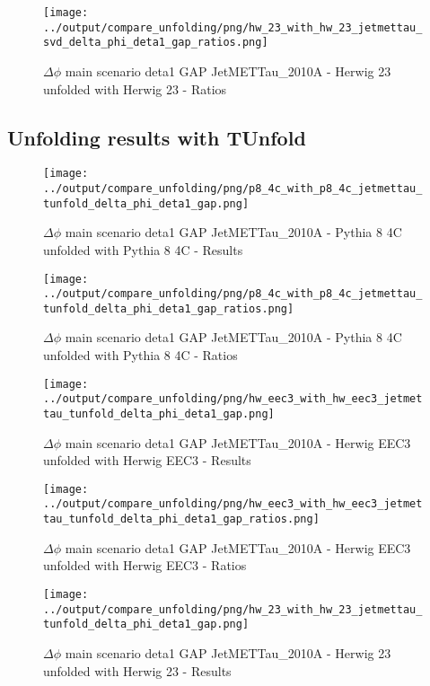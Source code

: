 \documentclass[11pt]{book}
\begin{document}
\begin{figure}[ht]
\centering
\texttt{[image: ../output/compare\_unfolding/png/hw\_23\_with\_hw\_23\_jetmettau\_svd\_delta\_phi\_deta1\_gap\_ratios.png]}
\caption{$\Delta\phi$ main scenario deta1 GAP JetMETTau\_2010A - Herwig 23 unfolded with Herwig 23 - Ratios}
\label{hw_23_hw_23_jetmettau_svd_delta_phi_deta1_gap_b}
\end{figure}


\clearpage
\subsection{Unfolding results with TUnfold}

\begin{figure}[ht]
\centering
\texttt{[image: ../output/compare\_unfolding/png/p8\_4c\_with\_p8\_4c\_jetmettau\_tunfold\_delta\_phi\_deta1\_gap.png]}
\caption{$\Delta\phi$ main scenario deta1 GAP JetMETTau\_2010A - Pythia 8 4C unfolded with Pythia 8 4C - Results}
\label{p8_p8_jetmettau_tunfold_delta_phi_deta1_gap_a}
\end{figure}

\begin{figure}[ht]
\centering
\texttt{[image: ../output/compare\_unfolding/png/p8\_4c\_with\_p8\_4c\_jetmettau\_tunfold\_delta\_phi\_deta1\_gap\_ratios.png]}
\caption{$\Delta\phi$ main scenario deta1 GAP JetMETTau\_2010A - Pythia 8 4C unfolded with Pythia 8 4C - Ratios}
\label{p8_p8_jetmettau_tunfold_delta_phi_deta1_gap_b}
\end{figure}

\begin{figure}[ht]
\centering
\texttt{[image: ../output/compare\_unfolding/png/hw\_eec3\_with\_hw\_eec3\_jetmettau\_tunfold\_delta\_phi\_deta1\_gap.png]}
\caption{$\Delta\phi$ main scenario deta1 GAP JetMETTau\_2010A - Herwig EEC3 unfolded with Herwig EEC3 - Results}
\label{hw_eec3_hw_eec3_jetmettau_tunfold_delta_phi_deta1_gap_a}
\end{figure}

\begin{figure}[ht]
\centering
\texttt{[image: ../output/compare\_unfolding/png/hw\_eec3\_with\_hw\_eec3\_jetmettau\_tunfold\_delta\_phi\_deta1\_gap\_ratios.png]}
\caption{$\Delta\phi$ main scenario deta1 GAP JetMETTau\_2010A - Herwig EEC3 unfolded with Herwig EEC3 - Ratios}
\label{hw_eec3_hw_eec3_jetmettau_tunfold_delta_phi_deta1_gap_b}
\end{figure}

\begin{figure}[ht]
\centering
\texttt{[image: ../output/compare\_unfolding/png/hw\_23\_with\_hw\_23\_jetmettau\_tunfold\_delta\_phi\_deta1\_gap.png]}
\caption{$\Delta\phi$ main scenario deta1 GAP JetMETTau\_2010A - Herwig 23 unfolded with Herwig 23 - Results}
\label{hw_23_hw_23_jetmettau_tunfold_delta_phi_deta1_gap_a}
\end{figure}
\end{document}
